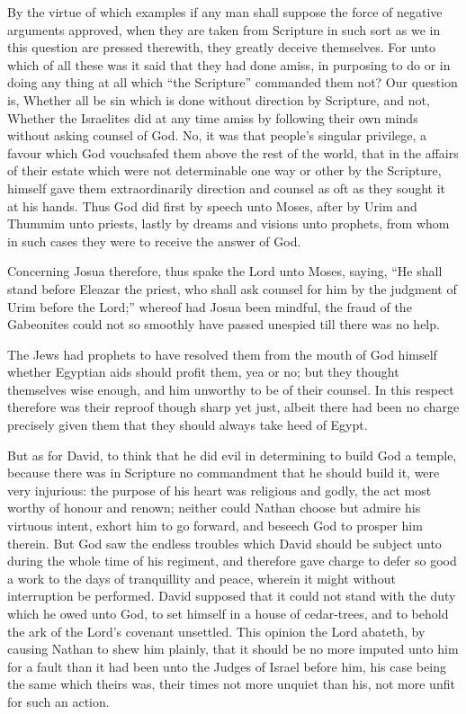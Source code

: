 By the virtue of which examples if any man shall suppose the force of negative arguments approved, when they are taken from Scripture in such sort as we in this question are pressed therewith, they greatly deceive themselves. For unto which of all these was it said that they had done amiss, in purposing to do or in doing any thing at all which “the Scripture” commanded them not? Our question is, Whether all be sin which is done without direction by Scripture, and not, Whether the Israelites did at any time amiss by following their own minds without asking counsel of God. No, it was that people’s singular privilege, a favour which God vouchsafed them above the rest of the world, that in the affairs of their estate which were not determinable one way or other by the Scripture, himself gave them extraordinarily direction and counsel as oft as they sought it at his hands. Thus God did first by speech unto Moses, after by Urim and Thummim unto priests, lastly by dreams and visions unto prophets, from whom in such cases they were to receive the answer of God.


Concerning Josua therefore, thus spake the Lord unto Moses, saying, “He shall stand before Eleazar the priest, who shall ask counsel for him by the judgment of Urim before the Lord;” whereof had Josua been mindful, the fraud of the Gabeonites could not so smoothly have passed unespied till there was no help.

The Jews had prophets to have resolved them from the mouth of God himself whether Egyptian aids should profit them, yea or no; but they thought themselves wise enough, and him unworthy to be of their counsel. In this respect therefore was their reproof though sharp yet just, albeit there had been no charge precisely given them that they should always take heed of Egypt.

But as for David, to think that he did evil in determining to build God a temple, because there was in Scripture no commandment that he should build it, were very injurious: the purpose of his heart was religious and godly, the act most worthy of honour and renown; neither could Nathan choose but admire his virtuous intent, exhort him to go forward, and beseech God to prosper him therein. But God saw the endless troubles which David should be subject unto during the whole time of his regiment, and therefore gave charge to defer so good a work to the days of tranquillity and peace, wherein it might without interruption be performed. David supposed that it could not stand with the duty which he owed unto God, to set himself in a house of cedar-trees, and to behold the ark of the Lord’s covenant unsettled. This opinion the Lord abateth, by causing Nathan to shew him plainly, that it should be no more imputed unto him for a fault than it had been unto the Judges of Israel before him, his case being the same which theirs was, their times not more unquiet than his, not more unfit for such an action.

